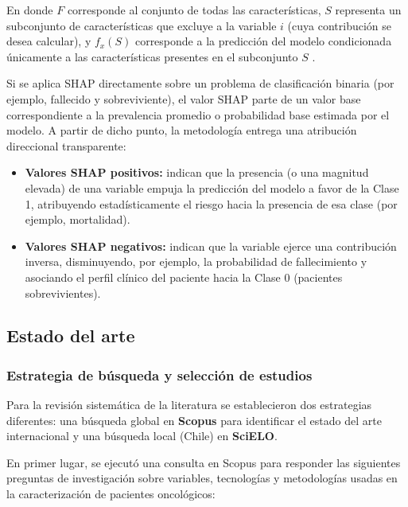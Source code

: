 En donde $F$ corresponde al conjunto de todas las características, $S$ representa un subconjunto de características que excluye a la variable $i$ (cuya contribución se desea calcular), y $f_x(S)$ corresponde a la predicción del modelo condicionada únicamente a las características presentes en el subconjunto $S$ \cite{lundberg2017shap}.


Si se aplica SHAP directamente sobre un problema de clasificación binaria (por ejemplo, fallecido y sobreviviente), el valor SHAP parte de un valor base correspondiente a la prevalencia promedio o probabilidad base estimada por el modelo. A partir de dicho punto, la metodología entrega una atribución direccional transparente:

\begin{itemize}
    \item \textbf{Valores SHAP positivos:} indican que la presencia (o una magnitud elevada) de una variable empuja la predicción del modelo a favor de la Clase 1, atribuyendo estadísticamente el riesgo hacia la presencia de esa clase (por ejemplo, mortalidad).
    \item \textbf{Valores SHAP negativos:} indican que la variable ejerce una contribución inversa, disminuyendo, por ejemplo, la probabilidad de fallecimiento y asociando el perfil clínico del paciente hacia la Clase 0 (pacientes sobrevivientes).
\end{itemize}

\subsection{Estado del arte}


\subsubsection{Estrategia de búsqueda y selección de estudios}

Para la revisión sistemática de la literatura se establecieron dos estrategias diferentes: una búsqueda global en \textbf{Scopus} para identificar el estado del arte internacional y una búsqueda local (Chile) en \textbf{SciELO}.

En primer lugar, se ejecutó una consulta en Scopus para responder las siguientes preguntas de investigación sobre variables, tecnologías y metodologías usadas en la caracterización de pacientes oncológicos:

